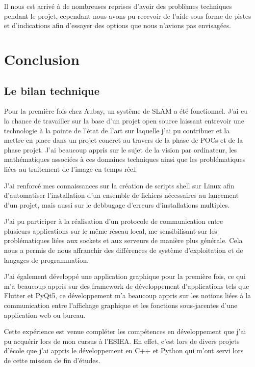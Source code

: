 \documentclass[11pt]{article}
\begin{document}
      Il nous est arrivé à de nombreuses reprises d'avoir des problèmes techniques pendant le projet, cependant 
      nous avons pu recevoir de l'aide sous forme de pistes et d'indications afin d'essayer des options que 
      nous n'avions pas envisagées.

  \pagebreak

  \section{Conclusion}

    \subsection{Le bilan technique}
      Pour la première fois chez Aubay, un système de SLAM a été fonctionnel. J'ai eu la chance de travailler sur la base d'un 
      projet open source laissant entrevoir une technologie à la pointe de l'état de l'art sur laquelle j'ai pu contribuer et la 
      mettre en place dans un projet concret au travers de la phase de POCs et de la phase projet. J'ai beaucoup appris sur le
      sujet de la vision par ordinateur, les mathématiques associées à ces domaines techniques ainsi que les problématiques 
      liées au traitement de l'image en temps réel.

      J'ai renforcé mes connaissances sur la création de scripts shell sur Linux afin d'automatiser l'installation d'un ensemble de 
      fichiers nécessaires au lancement d'un projet, mais aussi sur le debbugage d'erreurs d'installations multiples.
    
      J'ai pu participer à la réalisation d'un protocole de communication entre plusieurs applications sur le même réseau local, me 
      sensibilisant sur les problématiques liées aux sockets et aux serveurs de manière plus générale.
      Cela nous a permis de nous affranchir des différences de système d'exploitation et de langages de programmation. 
      
      J'ai également développé une application graphique pour la première fois, ce qui m'a beaucoup appris sur des framework de 
      développement d'applications tels que Flutter et PyQt5, ce développement m'a beaucoup appris sur les notions liées 
      à la communication entre l'affichage graphique et les fonctions sous-jacentes d'une application web ou bureau.

      Cette expérience est venue compléter les compétences en développement que j'ai pu acquérir lors de mon cursus à l'ESIEA. En
      effet, c'est lors de divers projets d'école que j'ai appris le développement en C++ et Python qui m'ont servi lors de cette 
      mission de fin d'études.
\end{document}
